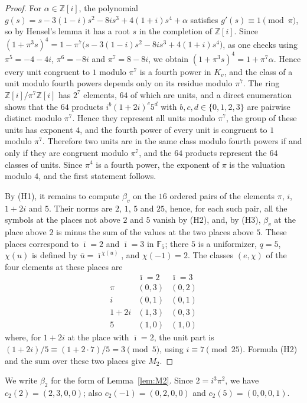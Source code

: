 \documentclass[11pt]{article}
\newcommand{\Z}{\mathbb{Z}}
\newcommand{\F}{\mathbb{F}}
\begin{document}
\begin{proof}
For $\alpha\in\Z[i]$, the polynomial $g(s)=s-3(1-i)s^2-8is^3+4(1+i)s^4+\alpha$ satisfies $g'(s)\equiv1\pmod\pi$, so by Hensel's lemma it has a root $s$ in the completion of $\Z[i]$. Since $(1+\pi^3s)^4=1-\pi^7\bigl(s-3(1-i)s^2-8is^3+4(1+i)s^4\bigr)$, as one checks using $\pi^5=-4-4i$, $\pi^6=-8i$ and $\pi^7=8-8i$, we obtain $(1+\pi^3s)^4=1+\pi^7\alpha$. Hence every unit congruent to $1$ modulo $\pi^7$ is a fourth power in $K_v$, and the class of a unit modulo fourth powers depends only on its residue modulo $\pi^7$. The ring $\Z[i]/\pi^7\Z[i]$ has $2^7$ elements, $64$ of which are units, and a direct enumeration shows that the $64$ products $i^b(1+2i)^c5^d$ with $b,c,d\in\{0,1,2,3\}$ are pairwise distinct modulo $\pi^7$. Hence they represent all units modulo $\pi^7$, the group of these units has exponent $4$, and the fourth power of every unit is congruent to $1$ modulo $\pi^7$. Therefore two units are in the same class modulo fourth powers if and only if they are congruent modulo $\pi^7$, and the $64$ products represent the $64$ classes of units. Since $\pi^4$ is a fourth power, the exponent of $\pi$ is the valuation modulo $4$, and the first statement follows.

By (H1), it remains to compute $\beta_v$ on the $16$ ordered pairs of the elements $\pi$, $i$, $1+2i$ and $5$. Their norms are $2$, $1$, $5$ and $25$, hence, for each such pair, all the symbols at the places not above $2$ and $5$ vanish by (H2), and, by (H3), $\beta_v$ at the place above $2$ is minus the sum of the values at the two places above $5$. These places correspond to $\bar\imath=2$ and $\bar\imath=3$ in $\F_5$; there $5$ is a uniformizer, $q=5$, $\chi(u)$ is defined by $\bar u=\bar\imath^{\,\chi(u)}$, and $\chi(-1)=2$. The classes $(e,\chi)$ of the four elements at these places are
\[
\begin{array}{c|cc}
 & \bar\imath=2 & \bar\imath=3\\\hline
\pi & (0,3) & (0,2)\\
i & (0,1) & (0,1)\\
1+2i & (1,3) & (0,3)\\
5 & (1,0) & (1,0)
\end{array}
\]
where, for $1+2i$ at the place with $\bar\imath=2$, the unit part is $(1+2i)/5\equiv(1+2\cdot7)/5=3\pmod5$, using $i\equiv7\pmod{25}$. Formula (H2) and the sum over these two places give $M_2$.
\end{proof}

We write $\beta_2$ for the form of Lemma~\ref{lem:M2}. Since $2=i^3\pi^2$, we have $c_2(2)=(2,3,0,0)$; also $c_2(-1)=(0,2,0,0)$ and $c_2(5)=(0,0,0,1)$.
\end{document}
